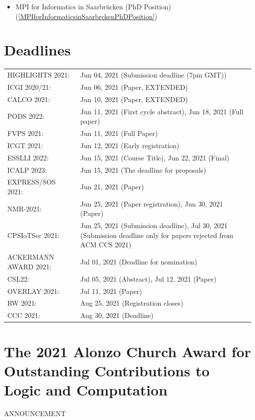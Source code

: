 \documentclass[prodmode,acmtecs]{acmsmall} %
\begin{document}
\begin{itemize}
\begin{itemize}\item MPI for Informatics in Saarbrücken (PhD Position) (\cref{MPIforInformaticsinSaarbrckenPhDPosition})
\end{itemize} 
\end{itemize}\section{Deadlines}\label{deadlines}\begin{tabulary}{\linewidth}{LL}HIGHLIGHTS 2021:  & Jun 04, 2021 (Submission deadline (7pm GMT)) \\
ICGI 2020/21:  & Jun 06, 2021 (Paper, EXTENDED) \\
CALCO 2021:  & Jun 10, 2021 (Paper, EXTENDED) \\
PODS 2022:  & Jun 11, 2021 (First cycle abstract), Jun 18, 2021 (Full paper) \\
FVPS 2021:  & Jun 11, 2021 (Full Paper) \\
ICGT 2021:  & Jun 12, 2021 (Early registration) \\
ESSLLI 2022:  & Jun 15, 2021 (Course Title), Jun 22, 2021 (Final) \\
ICALP 2023:  & Jun 15, 2021 (The deadline for proposals) \\
EXPRESS/SOS 2021:  & Jun 21, 2021 (Paper) \\
NMR-2021:  & Jun 25, 2021 (Paper registration), Jun 30, 2021 (Paper) \\
CPSIoTSec 2021:  & Jun 25, 2021 (Submission deadline), Jul 30, 2021 (Submission deadline only for papers rejected from ACM CCS 2021) \\
ACKERMANN AWARD 2021:  & Jul 01, 2021 (Deadline for nomination) \\
CSL22:  & Jul 05, 2021 (Abstract), Jul 12, 2021 (Paper) \\
OVERLAY 2021:  & Jul 11, 2021 (Paper) \\
RW 2021:  & Aug 25, 2021 (Registration closes) \\
CCC 2021:  & Aug 30, 2021 (Deadline) \\
\end{tabulary}
\section{The 2021 Alonzo Church Award for Outstanding Contributions to Logic and Computation}\label{The2021AlonzoChurchAwardforOutstandingContributionstoLogicandComputation}ANNOUNCEMENT 
\end{document}
